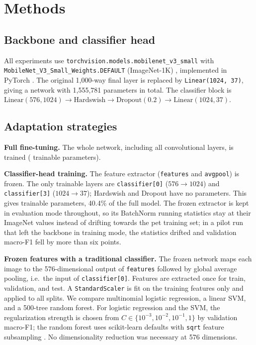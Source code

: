 \documentclass[10pt]{article}
\begin{document}
\section{Methods}
\subsection{Backbone and classifier head}
All experiments use \texttt{torchvision.models.mobilenet\_v3\_small} with
\texttt{MobileNet\_V3\_Small\_Weights.DEFAULT} (ImageNet-1K) \cite{howard2019mobilenetv3},
implemented in PyTorch \cite{paszke2019pytorch}.
The original 1,000-way final layer is replaced by \texttt{Linear(1024, 37)}, giving a
network with 1,555,781 parameters in total. The classifier block is
$\text{Linear}(576,1024) \rightarrow \text{Hardswish} \rightarrow \text{Dropout}(0.2)
\rightarrow \text{Linear}(1024,37)$.

\subsection{Adaptation strategies}
\textbf{Full fine-tuning.} The whole network, including all convolutional layers, is
trained (\fullParams{} trainable parameters).

\textbf{Classifier-head training.} The feature extractor (\texttt{features} and
\texttt{avgpool}) is frozen. The only trainable layers are \texttt{classifier[0]}
($576\rightarrow1024$) and \texttt{classifier[3]} ($1024\rightarrow37$); Hardswish and
Dropout have no parameters. This gives \headParams{} trainable parameters, 40.4\% of the
full model. The frozen extractor is kept in evaluation mode throughout, so its BatchNorm
running statistics stay at their ImageNet values instead of drifting towards the pet
training set; in a pilot run that left the backbone in training mode, the statistics
drifted and validation macro-F1 fell by more than six points.

\textbf{Frozen features with a traditional classifier.} The frozen network maps each
image to the 576-dimensional output of \texttt{features} followed by global average
pooling, i.e.\ the input of \texttt{classifier[0]}. Features are extracted once for
train, validation, and test. A \texttt{StandardScaler} is fit on the training features
only and applied to all splits. We compare multinomial logistic regression, a linear SVM,
and a 500-tree random forest. For logistic regression and the SVM, the regularization
strength is chosen from $C\in\{10^{-3},10^{-2},10^{-1},1\}$ by validation macro-F1; the
random forest uses scikit-learn defaults with \texttt{sqrt} feature subsampling
\cite{pedregosa2011sklearn}. No dimensionality reduction was necessary at 576 dimensions.
\end{document}
